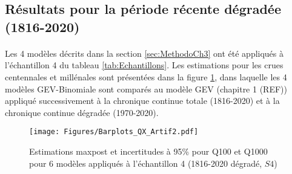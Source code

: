 \documentclass[11pt]{article}
\begin{document}
	\FloatBarrier	
	
	\subsection{Résultats pour la période récente dégradée (1816-2020)}
	\label{subsec:ResultsArtif}
	
	\paragraph{} 
	Les 4 modèles décrits dans la section \ref{sec:MethodoCh3} ont été appliqués à l'échantillon 4 du tableau \ref{tab:Echantillons}. Les estimations pour les crues centennales et millénales sont présentées dans la figure \ref{fig:Barplot_Artif2}, dans laquelle les 4 modèles GEV-Binomiale sont comparés au modèle GEV (chapitre 1 (REF)) appliqué successivement à la chronique continue totale (1816-2020) et à la chronique continue dégradée (1970-2020).
	
	
	\begin{figure}[h]
		\centering
		\texttt{[image: Figures/Barplots\_QX\_Artif2.pdf]}	
		\caption{Estimations maxpost et incertitudes à 95\% pour Q100 et Q1000 pour 6 modèles appliqués à l'échantillon 4 (1816-2020 dégradé, $S4$)}
		\label{fig:Barplot_Artif2}
	\end{figure}

	\begin{table}[h]
	\centering
	\caption{Résultats maxpost et incertitudes des 6 modèles pour l'échantillon 4. Q100 et Q1000 représentent respectivement le débit des crues centennales et millénales, $\xi$ le paramètre de forme de la distribution GEV, $S$ le seuil de perception et $t^{*}$ la date de début de la période historique. Les écarts type des distributions a posteriori sont représentés par les colonnes débutant par la lettre "u".}
	\label{tab:ResArtif2}

	\end{table}
	
\end{document}
